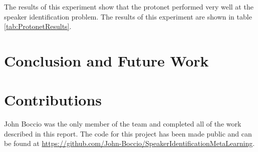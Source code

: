 \documentclass{article}
\begin{document}
The results of this experiment show that the protonet performed very well at the speaker identification problem. The results
of this experiment are shown in table \ref{tab:ProtonetResults}. 


\section{Conclusion and Future Work}

\section{Contributions}
John Boccio was the only member of the team and completed all of the work described in this report. The code for this 
project has been made public and can be found at 
\href{https://github.com/John-Boccio/SpeakerIdentificationMetaLearning}{https://github.com/John-Boccio/SpeakerIdentificationMetaLearning}.
\end{document}
